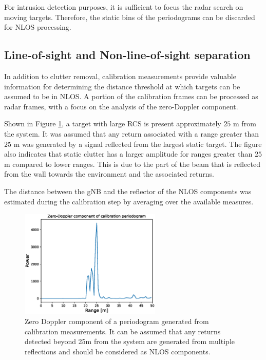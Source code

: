 	For intrusion detection purposes, it is sufficient to focus the radar search on moving targets. 
	Therefore, the static bins of the periodograms can be discarded for NLOS processing.
	
	\subsection{Line-of-sight and Non-line-of-sight separation}
	\label{sec:los_nlos_separation}
	
	
	
	In addition to clutter removal, calibration measurements provide valuable information for determining the distance threshold at which targets can be assumed to be in NLOS. 
	A portion of the calibration frames can be processed as radar frames, with a focus on the analysis of the zero-Doppler component.
	
	Shown in Figure \ref{fig:Test1_cali_static_per}, a target with large RCS is present approximately $25$ m from the system. It was assumed that any return associated with a range greater than $25$ m was generated by a signal reflected from the largest static target. The figure also indicates that static clutter has a larger amplitude for ranges greater than $25$ m compared to lower ranges. This is due to the part of the beam that is reflected from the wall towards the environment and the associated returns.
	
	The distance between the gNB and the reflector of the NLOS components was estimated during the calibration step by averaging over the available measures.
	
	
	\begin{figure}[H]
		\centering
		\includegraphics[width=0.6\textwidth]{Images/Test1/cali_static_per_t1.eps}
		\caption{Zero Doppler component of a periodogram generated from calibration measurements. It can be assumed that any returns detected beyond 25m from the system are generated from multiple reflections and should be considered as NLOS components. }
		\label{fig:Test1_cali_static_per}
	\end{figure}
	

